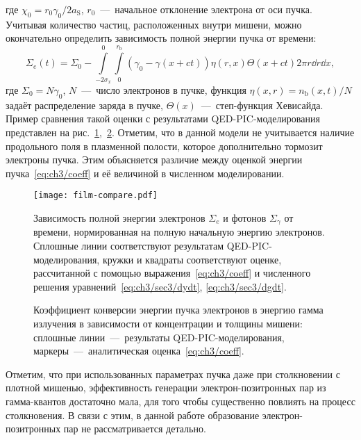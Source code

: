 где $\chi_0 = r_0 \gamma_0 / 2a_\mathrm{S}$, $r_0$~---~начальное отклонение электрона от оси пучка.
Учитывая количество частиц, расположенных внутри мишени, можно окончательно определить зависимость полной энергии пучка от времени:
\begin{equation}
    \label{eq:ch3/coeff}
    \Sigma_e(t) = \Sigma_0 - \int\limits_{-2\sigma_x}^0\int\limits_0^{r_\mathrm{b}}\left( \gamma_0 - \gamma(x + ct) \right) \eta(r, x) \Theta(x + ct) 2 \pi r \dd r \dd x ,
\end{equation}
где $\Sigma_0 = N \gamma_0$, $N$~---~число электронов в пучке, функция $\eta(x, r) = n_\mathrm{b}(x,t)/N$ задаёт распределение заряда в пучке, $\Theta(x)$~---~степ-функция Хевисайда.
Пример сравнения такой оценки с результатами QED-PIC-моделирования представлен на рис.~\ref{fig:ch3/compare},~\ref{fig:ch3/map}.
Отметим, что в данной модели не учитывается наличие продольного поля в плазменной полости, которое дополнительно тормозит электроны пучка.
Этим объясняется различие между оценкой энергии пучка~\eqref{eq:ch3/coeff} и её величиной в численном моделировании.

\begin{figure}
    \center\texttt{[image: film-compare.pdf]}
    \caption[Зависимость полной энергии электронов и фотонов от времени при распространении сильноточного пучка в твердотельной мишени]{\label{fig:ch3/compare}
    Зависимость полной энергии электронов $\Sigma_e$ и фотонов $\Sigma_\gamma$ от времени, нормированная на полную начальную энергию электронов.
Сплошные линии соответствуют результатам QED-PIC-моделирования, кружки и квадраты соответствуют оценке, рассчитанной с помощью выражения~\eqref{eq:ch3/coeff} и численного решения уравнений~\eqref{eq:ch3/sec3/dydt}, \eqref{eq:ch3/sec3/dgdt}.}
\end{figure}

\begin{figure}
    \caption[Коэффициент конверсии энергии пучка электронов в энергию гамма излучения в зависимости от концентрации и толщины мишени]{\label{fig:ch3/map}
    Коэффициент конверсии энергии пучка электронов в энергию гамма излучения в зависимости от концентрации и толщины мишени: сплошные линии~---~результаты QED-PIC-моделирования, маркеры~---~аналитическая оценка~\eqref{eq:ch3/coeff}.}
\end{figure}

Отметим, что при использованных параметрах пучка даже при столкновении с плотной мишенью, эффективность генерации электрон-позитронных пар из гамма-квантов достаточно мала, для того чтобы существенно повлиять на процесс столкновения.
В связи с этим, в данной работе образование электрон-позитронных пар не рассматривается детально.

